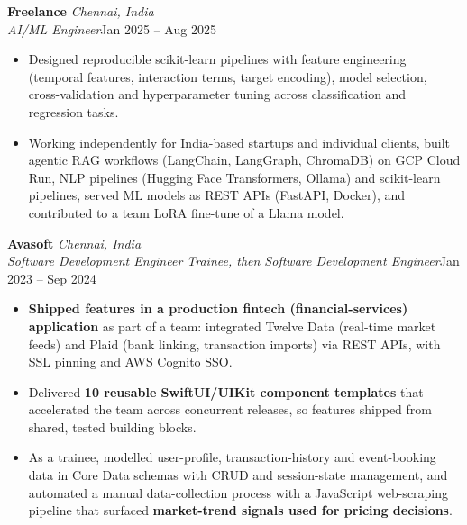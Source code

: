 \documentclass[a4paper,11pt]{article}
\newcommand{\role}[4]{%
  \textbf{#1}{\color{muted}\,\textperiodcentered\,\textit{#2}}\\
  \textit{#4}\hfill{\color{muted}#3}\par}
\newcommand{\gap}{\vspace{5pt}}
\newcommand{\num}[1]{\textbf{#1}}   %
\begin{document}
\gap
{}
\role{Freelance}{Chennai, India}{Jan 2025 – Aug 2025}{AI/ML Engineer}
\begin{itemize}
  \item Designed reproducible scikit-learn pipelines with feature engineering (temporal features, interaction terms, target encoding), model selection, cross-validation and hyperparameter tuning across classification and regression tasks.
  \item Working independently for India-based startups and individual clients, built agentic RAG workflows (LangChain, LangGraph, ChromaDB) on GCP Cloud Run, NLP pipelines (Hugging Face Transformers, Ollama) and scikit-learn pipelines, served ML models as REST APIs (FastAPI, Docker), and contributed to a team LoRA fine-tune of a Llama model.
\end{itemize}
\gap
{}
\role{Avasoft}{Chennai, India}{Jan 2023 – Sep 2024}{Software Development Engineer Trainee, then Software Development Engineer}
\begin{itemize}
  \item \num{Shipped features in a production fintech (financial-services) application} as part of a team: integrated Twelve Data (real-time market feeds) and Plaid (bank linking, transaction imports) via REST APIs, with SSL pinning and AWS Cognito SSO.
  \item Delivered \num{10 reusable SwiftUI/UIKit component templates} that accelerated the team across concurrent releases, so features shipped from shared, tested building blocks.
  \item As a trainee, modelled user-profile, transaction-history and event-booking data in Core Data schemas with CRUD and session-state management, and automated a manual data-collection process with a JavaScript web-scraping pipeline that surfaced \num{market-trend signals used for pricing decisions}.
\end{itemize}
\end{document}
